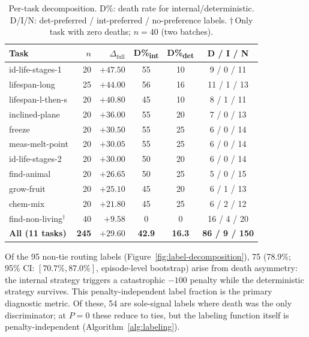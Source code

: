 \begin{table}[t]
\centering
\scriptsize
\setlength{\tabcolsep}{2.5pt}
\begin{tabular}{@{}lrrccc@{}}
\toprule
Task & $n$ & $\Delta_\text{full}$ & D\%\textsubscript{int} & D\%\textsubscript{det} & D / I / N \\
\midrule
id-life-stages-1       & 20  & $+47.50$ & 55   & 10   & 9 / 0 / 11  \\
lifespan-long          & 25  & $+44.00$ & 56   & 16   & 11 / 1 / 13 \\
lifespan-l-then-s      & 20  & $+40.80$ & 45   & 10   & 8 / 1 / 11  \\
inclined-plane         & 20  & $+36.00$ & 55   & 20   & 7 / 0 / 13  \\
freeze                 & 20  & $+30.50$ & 55   & 25   & 6 / 0 / 14  \\
meas-melt-point        & 20  & $+30.05$ & 55   & 25   & 6 / 0 / 14  \\
id-life-stages-2       & 20  & $+30.00$ & 50   & 20   & 6 / 0 / 14  \\
find-animal            & 20  & $+26.65$ & 50   & 25   & 5 / 0 / 15  \\
grow-fruit             & 20  & $+25.10$ & 45   & 20   & 6 / 1 / 13  \\
chem-mix               & 20  & $+21.80$ & 45   & 25   & 6 / 2 / 12  \\
\midrule
find-non-living$^\dagger$ & 40 & $+9.58$ & 0  & 0    & 16 / 4 / 20 \\
\midrule
\textbf{All (11 tasks)} & \textbf{245} & $\mathbf{+29.60}$ & \textbf{42.9} & \textbf{16.3} & \textbf{86 / 9 / 150} \\
\bottomrule
\end{tabular}
\caption{Per-task decomposition. D\%: death rate for internal/deterministic. D/I/N: det-preferred / int-preferred / no-preference labels. $\dagger$\,Only task with zero deaths; $n{=}40$ (two batches).}
\label{tab:per-task}
\end{table}

Of the 95 non-tie routing labels (Figure~\ref{fig:label-decomposition}), 75 (78.9\%; 95\% CI: $[70.7\%, 87.0\%]$, episode-level bootstrap) arise from death asymmetry: the internal strategy triggers a catastrophic $-100$ penalty while the deterministic strategy survives. This penalty-independent label fraction is the primary diagnostic metric. Of these, 54 are sole-signal labels where death was the only discriminator; at $P{=}0$ these reduce to ties, but the labeling function itself is penalty-independent (Algorithm~\ref{alg:labeling}).

